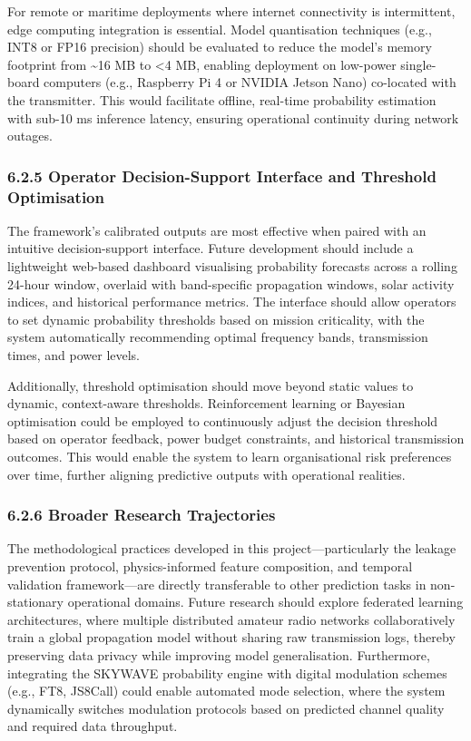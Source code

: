 For remote or maritime deployments where internet connectivity is
intermittent, edge computing integration is essential. Model
quantisation techniques (e.g., INT8 or FP16 precision) should be
evaluated to reduce the model's memory footprint from \textasciitilde16
MB to \textless4 MB, enabling deployment on low-power single-board
computers (e.g., Raspberry Pi 4 or NVIDIA Jetson Nano) co-located with
the transmitter. This would facilitate offline, real-time probability
estimation with sub-10 ms inference latency, ensuring operational
continuity during network outages.

\subsubsection{6.2.5 Operator Decision-Support Interface and Threshold
Optimisation}\label{operator-decision-support-interface-and-threshold-optimisation}

The framework's calibrated outputs are most effective when paired with
an intuitive decision-support interface. Future development should
include a lightweight web-based dashboard visualising probability
forecasts across a rolling 24-hour window, overlaid with band-specific
propagation windows, solar activity indices, and historical performance
metrics. The interface should allow operators to set dynamic probability
thresholds based on mission criticality, with the system automatically
recommending optimal frequency bands, transmission times, and power
levels.

Additionally, threshold optimisation should move beyond static values to
dynamic, context-aware thresholds. Reinforcement learning or Bayesian
optimisation could be employed to continuously adjust the decision
threshold based on operator feedback, power budget constraints, and
historical transmission outcomes. This would enable the system to learn
organisational risk preferences over time, further aligning predictive
outputs with operational realities.

\subsubsection{6.2.6 Broader Research
Trajectories}\label{broader-research-trajectories}

The methodological practices developed in this project---particularly
the leakage prevention protocol, physics-informed feature composition,
and temporal validation framework---are directly transferable to other
prediction tasks in non-stationary operational domains. Future research
should explore federated learning architectures, where multiple
distributed amateur radio networks collaboratively train a global
propagation model without sharing raw transmission logs, thereby
preserving data privacy while improving model generalisation.
Furthermore, integrating the SKYWAVE probability engine with digital
modulation schemes (e.g., FT8, JS8Call) could enable automated mode
selection, where the system dynamically switches modulation protocols
based on predicted channel quality and required data throughput.

